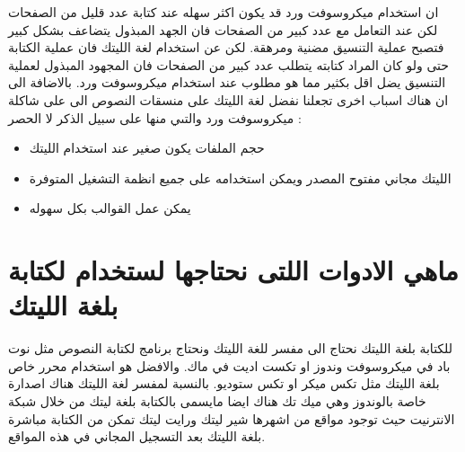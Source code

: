 ان استخدام ميكروسوفت ورد قد يكون اكثر سهله عند كتابة عدد قليل من الصفحات لكن عند التعامل مع عدد كبير من الصفحات فان الجهد المبذول يتضاعف بشكل كبير فتصبح عملية التنسيق مضنية ومرهقة. لكن عن استخدام لغة الليتك فان عملية الكتابة حتى ولو كان المراد كتابته يتطلب عدد كبير من الصفحات فان المجهود المبذول لعملية التنسيق يضل اقل بكثير مما هو مطلوب عند استخدام ميكروسوفت ورد. بالاضافة الى ان هناك اسباب اخرى تجعلنا نفضل لغة الليتك على منسقات النصوص الى على شاكلة ميكروسوفت ورد والتىي منها على سبيل الذكر لا الحصر :\\
\begin{itemize}
\item{حجم الملفات يكون صغير عند استخدام الليتك}
\item{الليتك مجاني مفتوح المصدر ويمكن استخدامه على جميع انظمة التشغيل المتوفرة}
\item{يمكن عمل القوالب بكل سهوله}
\end{itemize}

\section{ماهي الادوات اللتى نحتاجها لستخدام لكتابة بلغة الليتك}

للكتابة بلغة الليتك نحتاج الى مفسر للغة الليتك ونحتاج برنامج لكتابة النصوص مثل نوت باد في ميكروسوفت وندوز او تكست اديت في ماك. والافضل هو استخدام محرر خاص بلغة الليتك مثل تكس ميكر او تكس ستوديو. بالنسبة لمفسر لغة الليتك هناك اصدارة خاصة بالوندوز وهي ميك تك
هناك ايضا مايسمى بالكتابة بلغة ليتك من خلال شبكة الانترنيت حيث توجود مواقع من اشهرها شير ليتك ورايت ليتك تمكن من الكتابة مباشرة بلغة الليتك بعد التسجيل المجاني في هذه المواقع.
